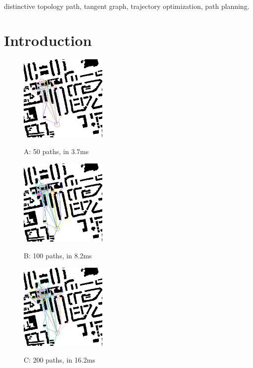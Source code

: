 \documentclass[letterpaper, 10 pt, journal, twoside]{IEEEtran}
\begin{document}
\begin{IEEEkeywords}
distinctive topology path, tangent graph, trajectory optimization, path planning.
\end{IEEEkeywords}

\section{Introduction}




\begin{figure}[t] \scriptsize
\begin{minipage}{.48\linewidth}
  \centerline{\includegraphics[width=4.2cm, cframe=gray .2mm]{50_RJ.png}}
  \centerline{A: 50 paths, in 3.7ms}
\end{minipage}
\hfill
\begin{minipage}{.48\linewidth}
  \centerline{\includegraphics[width=4.2cm, cframe=gray 0.1mm]{100_RJ.png}}
  \centerline{B: 100 paths, in 8.2ms}
\end{minipage}
\vfill
\begin{minipage}{.48\linewidth}
  \centerline{\includegraphics[width=4.2cm, cframe=gray 0.1mm]{200_RJ.png}}
  \centerline{C: 200 paths, in 16.2ms}

\end{minipage}
\end{figure}
\end{document}

